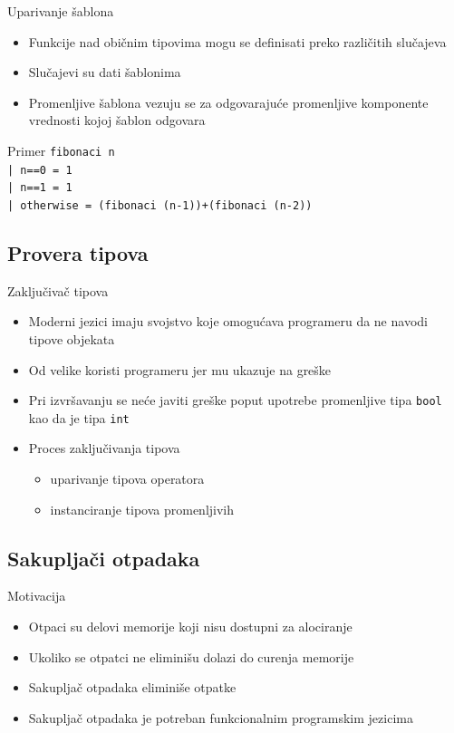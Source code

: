 \documentclass[xcolor={dvipsnames}, 11pt]{beamer}
\begin{document}
\begin{frame}{Uparivanje šablona}
	\begin{itemize}
		\item Funkcije nad običnim tipovima mogu se definisati preko različitih slučajeva
		\item Slučajevi su dati šablonima
		\item Promenljive šablona vezuju se za odgovarajuće promenljive komponente vrednosti kojoj šablon odgovara
	\end{itemize}

	\begin{block}{Primer}
		\texttt{fibonaci n
                  \\ | n==0 = 1
                  \\ | n==1 = 1
                  \\ | otherwise = (fibonaci (n-1))+(fibonaci (n-2))}
	\end{block}

\end{frame}


\subsection{Provera tipova}

\begin{frame}{Zaključivač tipova}
	
	\begin{itemize}
		\item Moderni jezici imaju svojstvo koje omogućava programeru da ne navodi tipove objekata
		\item Od velike koristi programeru jer mu ukazuje na greške
		\item Pri izvršavanju se neće javiti greške poput upotrebe promenljive tipa \texttt{bool} kao da je tipa \texttt{int}
		\item Proces zaključivanja tipova
		\begin{itemize}
			\item uparivanje tipova operatora
			\item instanciranje tipova promenljivih
		\end{itemize}
	\end{itemize}
	
\end{frame}


\subsection{Sakupljači otpadaka}
\begin{frame}{Motivacija}
	\begin{itemize}
		\item Otpaci su delovi memorije koji nisu dostupni za alociranje
		\item Ukoliko se otpatci ne eliminišu dolazi do curenja memorije
		\item Sakupljač otpadaka eliminiše otpatke
		\item Sakupljač otpadaka je potreban funkcionalnim programskim jezicima
	\end{itemize}
\end{frame}
\end{document}
